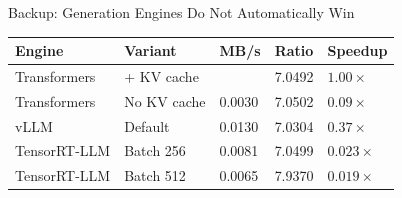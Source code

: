 
\begin{frame}{Backup: Generation Engines Do Not Automatically Win}
  \small
  \begin{tabularx}{\textwidth}{llYYY}
    \toprule
    \textbf{Engine} & \textbf{Variant} & \textbf{MB/s} & \textbf{Ratio} & \textbf{Speedup} \\
    \midrule
    Transformers & + KV cache &  & 7.0492 & $1.00\times$ \\
    Transformers & No KV cache & 0.0030 & 7.0502 & $0.09\times$ \\
    vLLM & Default & 0.0130 & 7.0304 & $0.37\times$ \\
    TensorRT-LLM & Batch 256 & 0.0081 & 7.0499 & $0.023\times$ \\
    TensorRT-LLM & Batch 512 & 0.0065 & 7.9370 & $0.019\times$ \\
    \bottomrule
  \end{tabularx}

\end{frame}

